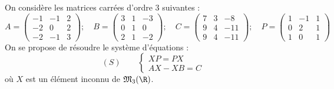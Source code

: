 \documentclass[11pt]{article}%
\begin{document}
On considère les matrices carrées d'ordre 3 suivantes :
\[
A = \left( 
\begin{array}{rrr}
-1 & -1 & 2 \\
-2 & 0 & 2 \\
-2 & -1 & 3
\end{array}
\right) ;\quad B = \left( 
\begin{array}{rrr}
3 & 1 & -3 \\
0 & 1 & 0 \\
2 & 1 & -2
\end{array}
\right) ;\quad C = \left( 
\begin{array}{rrr}
7 & 3 & -8 \\
9 & 4 & -11 \\
9 & 4 & -11
\end{array}
\right) ;\quad P = \left( 
\begin{array}{rrr}
1 & -1 & 1 \\
0 & 2 & 1 \\
1 & 0 & 1
\end{array}
\right) 
\]
On se propose de résoudre le système d'équations : 
\[
\left( S\right) \qquad \left\{ 
\begin{array}{c}
XP = PX \\
AX-XB = C
\end{array}
\right. 
\]
où $X$ est un élément inconnu de $\mathfrak{M}_{3}(\R)$.
\end{document}
